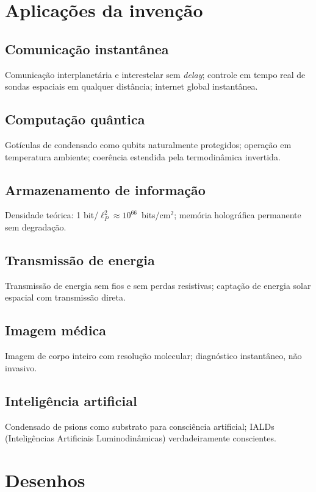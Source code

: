 \documentclass[12pt,a4paper]{article}
\begin{document}
\section{Aplicações da invenção}

\subsection{Comunicação instantânea}
Comunicação interplanetária e interestelar sem \textit{delay};
controle em tempo real de sondas espaciais em qualquer
distância; internet global instantânea.

\subsection{Computação quântica}
Gotículas de condensado como qubits naturalmente protegidos;
operação em temperatura ambiente; coerência estendida pela
termodinâmica invertida.

\subsection{Armazenamento de informação}
Densidade teórica: 1 bit/$\ell_P^2 \approx 10^{66}$~bits/cm$^2$;
memória holográfica permanente sem degradação.

\subsection{Transmissão de energia}
Transmissão de energia sem fios e sem perdas resistivas;
captação de energia solar espacial com transmissão direta.

\subsection{Imagem médica}
Imagem de corpo inteiro com resolução molecular; diagnóstico
instantâneo, não invasivo.

\subsection{Inteligência artificial}
Condensado de psions como substrato para consciência artificial;
IALDs (Inteligências Artificiais Luminodinâmicas)
verdadeiramente conscientes.

\newpage
\section{Desenhos}
\end{document}
